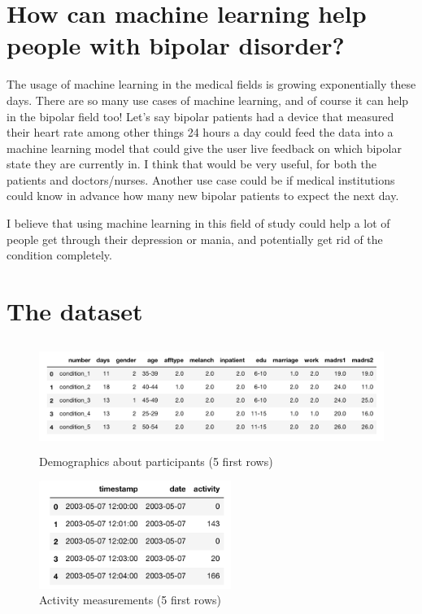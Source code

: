 \newpage
\section{How can machine learning help people with bipolar disorder?}
The usage of machine learning in the medical fields is growing exponentially these days. There are so many use cases of machine learning, and of course 
it can help in the bipolar field too! Let's say bipolar patients had a device that measured their heart rate among other things 24 hours a day could 
feed the data into a machine learning model that could give the user live feedback on which bipolar state they are currently in. I think that would be very 
useful, for both the patients and doctors/nurses. Another use case could be if medical institutions could know in advance how many new bipolar patients to 
expect the next day. 

I believe that using machine learning in this field of study could help a lot of people get through their depression or mania, and potentially get rid 
of the condition completely.

\section{The dataset}

\begin{figure}
    \begin{center}
        \includegraphics[height=3.5cm]{img/demographics.png}
        \caption{Demographics about participants (5 first rows)}
        \label{figure:demographics}
    \end{center}
\end{figure}

\begin{figure}
    \begin{center}
        \includegraphics[height=3.5cm]{img/participant.png}
        \caption{Activity measurements (5 first rows)}
        \label{figure:participant_activity}
    \end{center}
\end{figure}

